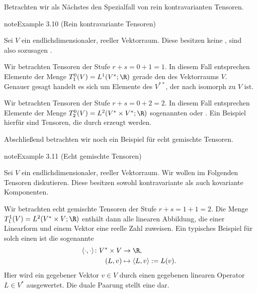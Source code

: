 \documentclass[letterpaper,10pt,english]{jupyterBook}
\begin{document}
\sphinxAtStartPar
Betrachten wir als Nächstes den Spezialfall von rein kontravarianten Tensoren.
\label{vektoranalysis/tensor:example-23}
\begin{sphinxadmonition}{note}{Example 3.10 (Rein kontravariante Tensoren)}



\sphinxAtStartPar
Sei \(V\) ein endlich\sphinxhyphen{}dimensionaler, reeller Vektorraum.
Diese besitzen keine , sind also sozusagen .

\sphinxAtStartPar
{}
Wir betrachten Tensoren der Stufe \(r+s=0+1=1\).
In diesem Fall entsprechen Elemente der Menge \(T^0_1(V) = L^1(V^\ast; \R)\) gerade den  des Vektorraums \(V\).
Genauer gesagt handelt es sich um Elemente des  \(V^{**}\), der nach {\hyperref[\detokenize{vektoranalysis/multilinear:rem:doubledual}]{}} isomorph zu \(V\) ist.

\sphinxAtStartPar
{}
Wir betrachten Tensoren der Stufe \(r+s=0+2=2\).
In diesem Fall entsprechen Elemente der Menge \(T^0_2(V) = L^2(V^\ast \times V^\ast; \R)\) sogenannten  oder .
Ein Beispiel hierfür sind Tensoren, die durch  erzeugt werden.
\end{sphinxadmonition}

\sphinxAtStartPar
Abschließend betrachten wir noch ein Beispiel für echt gemischte Tensoren.
\label{vektoranalysis/tensor:example-24}
\begin{sphinxadmonition}{note}{Example 3.11 (Echt gemischte Tensoren)}



\sphinxAtStartPar
Sei \(V\) ein endlich\sphinxhyphen{}dimensionaler, reeller Vektorraum.
Wir wollen im Folgenden  Tensoren diskutieren.
Diese besitzen sowohl kontravariante als auch kovariante Komponenten.

\sphinxAtStartPar
Wir betrachten echt gemischte Tensoren der Stufe \(r+s=1+1=2\).
Die Menge \(T^1_1(V) = L^2(V^\ast \times V; \R)\) enthält dann alle linearen Abbildung, die einer Linearform und einem Vektor eine reelle Zahl zuweisen.
Ein typisches Beispiel für solch einen ist die sogenannte 
\begin{equation*}
\begin{split}\langle \cdot, \cdot \rangle \colon V^\ast \times V &\rightarrow \R,\\
(L, v) &\mapsto \langle L, v \rangle := L(v).\end{split}
\end{equation*}
\sphinxAtStartPar
Hier wird ein gegebener Vektor \(v \in V\) durch einen gegebenen linearen Operator \(L \in V^\ast\) ausgewertet.
Die duale Paarung stellt eine  dar.
\end{sphinxadmonition}
\end{document}

